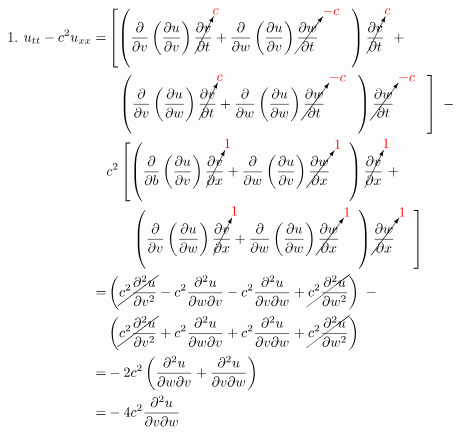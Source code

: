 \begin{enumerate}
    \item $\begin{aligned}[t]
        u_{tt} - c^2 u_{xx}
        = & \left[ \left( \frac{\partial}{\partial v} \left( \frac{\partial u}{\partial v} \right) \cancelto{\color{red}c}{\frac{\partial v}{\partial t}} + \frac{\partial}{\partial w} \left( \frac{\partial u}{\partial v} \right) \cancelto{\color{red}-c}{\frac{\partial w}{\partial t}} ~~~~~~~ \right) \cancelto{\color{red}c}{\frac{\partial v}{\partial t}} \right. ~+ \\ & ~~ \left. \left( \frac{\partial}{\partial v} \left( \frac{\partial u}{\partial w} \right) \cancelto{\color{red}c}{\frac{\partial v}{\partial t}} + \frac{\partial}{\partial w} \left( \frac{\partial u}{\partial w} \right) \cancelto{\color{red}-c}{\frac{\partial w}{\partial t}} ~~~~~~~ \right) \cancelto{\color{red}-c}{\frac{\partial w}{\partial t}} ~~~~~~~ \right] ~- \\ & c^2 \left[ \left( \frac{\partial}{\partial b} \left( \frac{\partial u}{\partial v} \right) \cancelto{\color{red}1}{\frac{\partial v}{\partial x}} + \frac{\partial}{\partial w} \left( \frac{\partial u}{\partial v} \right) \cancelto{\color{red}1}{\frac{\partial w}{\partial x}} ~~~~ \right) \cancelto{\color{red}1}{\frac{\partial v}{\partial x}} ~+ \right. \\ & ~~~~~ \left. \left( \frac{\partial}{\partial v} \left( \frac{\partial u}{\partial w} \right) \cancelto{\color{red}1}{\frac{\partial v}{\partial x}} + \frac{\partial}{\partial w} \left( \frac{\partial u}{\partial w} \right) \cancelto{\color{red}1} {\frac{\partial w}{\partial x}} ~~~~ \right) \cancelto{\color{red}1}{\frac{\partial w}{\partial x}} ~~~~ \right] \\
        = & \left( \cancel{c^2 \frac{\partial^2 u}{\partial v^2}} - c^2 \frac{\partial^2 u}{\partial w \partial v} - c^2 \frac{\partial^2 u}{\partial v \partial w} + \cancel{c^2 \frac{\partial^2 u}{\partial w^2}} \right) ~- \\ & \left( \cancel{c^2 \frac{\partial^2 u}{\partial v^2}} + c^2 \frac{\partial^2 u}{\partial w \partial v} + c^2 \frac{\partial^2 u}{\partial v \partial w} + \cancel{c^2 \frac{\partial^2 u}{\partial w^2}} \right) \\
        = & -2c^2 \left( \frac{\partial^2 u}{\partial w \partial v} + \frac{\partial^2 u}{\partial v \partial w} \right) \\
        = & -4c^2 \frac{\partial^2 u}{\partial v \partial w}
    \end{aligned}$
    

\end{enumerate}
